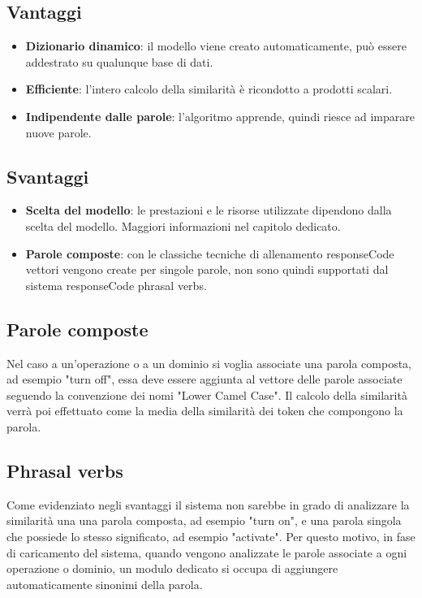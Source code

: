 \documentclass[twoside]{supsistudent}
\begin{document}
\subsection{Vantaggi}
\begin{itemize}
  \item \textbf{Dizionario dinamico}: il modello viene creato automaticamente, può essere addestrato su qualunque base di dati.
  \item \textbf{Efficiente}: l'intero calcolo della similarità è ricondotto a prodotti scalari.
    \item \textbf{Indipendente dalle parole}: l'algoritmo apprende, quindi riesce ad imparare nuove parole.
\end{itemize}
\subsection{Svantaggi}
\begin{itemize}
  \item \textbf{Scelta del modello}: le prestazioni e le risorse utilizzate dipendono dalla scelta del modello. Maggiori informazioni nel capitolo dedicato.
  \item \textbf{Parole composte}: con le classiche tecniche di allenamento responseCode vettori vengono create per singole parole, non sono quindi supportati dal sistema responseCode phrasal verbs.
\end{itemize}
\subsection{Parole composte}
Nel caso a un'operazione o a un dominio si voglia associate una parola composta, ad esempio "turn off", essa deve essere aggiunta al vettore delle parole associate seguendo la convenzione dei nomi "Lower Camel Case". Il calcolo della similarità verrà poi effettuato come la media della similarità dei token che compongono la parola.\cite{lcc}
\subsection{Phrasal verbs}
Come evidenziato negli svantaggi il sistema non sarebbe in grado di analizzare la similarità una una parola composta, ad esempio "turn on", e una parola singola che possiede lo stesso significato, ad esempio "activate".
Per questo motivo, in fase di caricamento del sistema, quando vengono analizzate le parole associate a ogni operazione o dominio, un modulo dedicato si occupa di aggiungere automaticamente sinonimi della parola.
\end{document}
